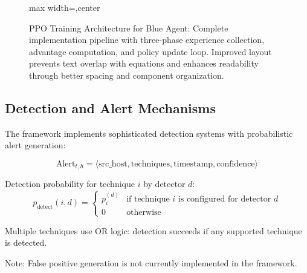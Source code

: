 \documentclass[12pt,oneside]{article}
\begin{document}
\begin{figure}[H]
\begin{adjustbox}{max width=\linewidth,center}
\end{adjustbox}
\caption{PPO Training Architecture for Blue Agent: Complete implementation pipeline with three-phase experience collection, advantage computation, and policy update loop. Improved layout prevents text overlap with equations and enhances readability through better spacing and component organization.}
\label{fig:ppo_training_architecture}
\end{figure}

\subsection{Detection and Alert Mechanisms}

The framework implements sophisticated detection systems with probabilistic alert generation:

\begin{equation}
\text{Alert}_{t,h} = \langle \text{src\_host}, \text{techniques}, \text{timestamp}, \text{confidence} \rangle
\end{equation}

Detection probability for technique $i$ by detector $d$:
\begin{equation}
p_{\text{detect}}(i, d) = \begin{cases}
p_i^{(d)} & \text{if technique } i \text{ is configured for detector } d \\
0 & \text{otherwise}
\end{cases}
\end{equation}

Multiple techniques use OR logic: detection succeeds if any supported technique is detected.

Note: False positive generation is not currently implemented in the framework.

\end{document}
